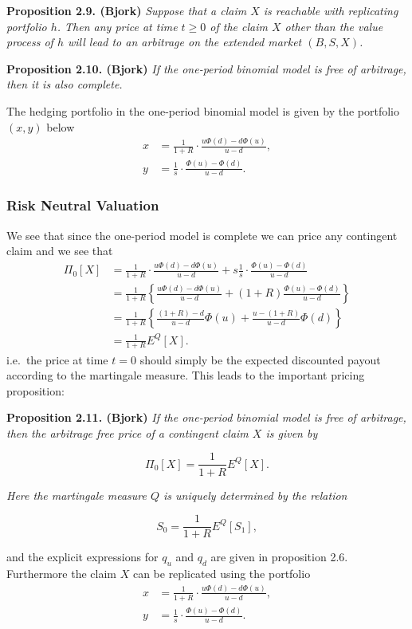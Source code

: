 \documentclass[a4paper,12pt,openany]{book}
\begin{document}
\textbf{Proposition 2.9. (Bjork)} \emph{Suppose that a claim \(X\) is reachable with replicating portfolio \(h\). Then any price at time \(t\ge 0\) of the claim \(X\) other than the value process of \(h\) will lead to an arbitrage on the extended market \((B,S,X)\).}

\textbf{Proposition 2.10. (Bjork)} \emph{If the one-period binomial model is free of arbitrage, then it is also complete.}

The hedging portfolio in the one-period binomial model is given by the portfolio \((x,y)\) below
\begin{align*}
x&=\frac{1}{1+R}\cdot\frac{u\Phi(d)-d\Phi(u)}{u-d},\tag{2.2}\\
y&=\frac{1}{s}\cdot\frac{\Phi(u)-\Phi(d)}{u-d}.\tag{2.3}
\end{align*}

\hypertarget{risk-neutral-valuation}{%
\subsubsection{Risk Neutral Valuation}\label{risk-neutral-valuation}}

We see that since the one-period model is complete we can price any contingent claim and we see that
\begin{align*}
\Pi_0[X]&=\frac{1}{1+R}\cdot\frac{u\Phi(d)-d\Phi(u)}{u-d}+s\frac{1}{s}\cdot\frac{\Phi(u)-\Phi(d)}{u-d}\\
&=\frac{1}{1+R}\left\{\frac{u\Phi(d)-d\Phi(u)}{u-d}+(1+R)\frac{\Phi(u)-\Phi(d)}{u-d}\right\}\\
&=\frac{1}{1+R}\left\{\frac{(1+R)-d}{u-d}\Phi(u)+\frac{u-(1+R)}{u-d}\Phi(d)\right\}\\
&=\frac{1}{1+R}E^Q[X].
\end{align*}
i.e.~the price at time \(t=0\) should simply be the expected discounted payout according to the martingale measure. This leads to the important pricing proposition:

\textbf{Proposition 2.11. (Bjork)} \emph{If the one-period binomial model is free of arbitrage, then the arbitrage free price of a contingent claim \(X\) is given by}

\[
\Pi_0[X]=\frac{1}{1+R}E^Q[X].\tag{2.4}
\]

\emph{Here the martingale measure \(Q\) is uniquely determined by the relation}

\[
S_0=\frac{1}{1+R}E^Q[S_1],\tag{2.5}
\]

and the explicit expressions for \(q_u\) and \(q_d\) are given in proposition 2.6. Furthermore the claim \(X\) can be replicated using the portfolio
\begin{align*}
x&=\frac{1}{1+R}\cdot\frac{u\Phi(d)-d\Phi(u)}{u-d},\tag{2.6}\\
y&=\frac{1}{s}\cdot\frac{\Phi(u)-\Phi(d)}{u-d}.\tag{2.7}
\end{align*}
\end{document}
